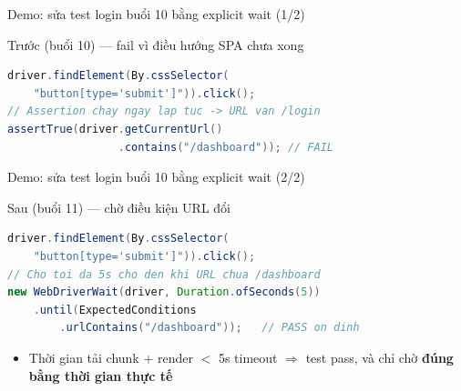 \documentclass[aspectratio=169,12pt]{beamer}
\begin{document}
\begin{frame}[fragile]{Demo: sửa test login buổi 10 bằng explicit wait (1/2)}
  \begin{alertblock}{Trước (buổi 10) --- fail vì điều hướng SPA chưa xong}
\begin{lstlisting}[language=Java]
driver.findElement(By.cssSelector(
    "button[type='submit']")).click();
// Assertion chay ngay lap tuc -> URL van /login
assertTrue(driver.getCurrentUrl()
                 .contains("/dashboard")); // FAIL
\end{lstlisting}
  \end{alertblock}
\end{frame}

\begin{frame}[fragile]{Demo: sửa test login buổi 10 bằng explicit wait (2/2)}
  \begin{exampleblock}{Sau (buổi 11) --- chờ điều kiện URL đổi}
\begin{lstlisting}[language=Java]
driver.findElement(By.cssSelector(
    "button[type='submit']")).click();
// Cho toi da 5s cho den khi URL chua /dashboard
new WebDriverWait(driver, Duration.ofSeconds(5))
    .until(ExpectedConditions
        .urlContains("/dashboard"));   // PASS on dinh
\end{lstlisting}
  \end{exampleblock}

  \begin{itemize}
    \item Thời gian tải chunk + render $<$ 5s timeout $\Rightarrow$
          test pass, và chỉ chờ \textbf{đúng bằng thời gian thực tế}
  \end{itemize}
\end{frame}
\end{document}
